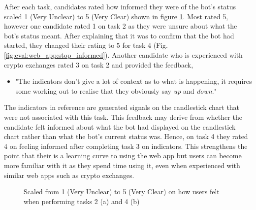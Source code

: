 After each task, candidates rated how informed they were of the bot's status scaled 1 (Very Unclear) to 5 (Very Clear) shown in figure \ref{fig:eval:web_app:start_stop_informed}. Most rated 5, however one candidate rated 1 on task 2 as they were unsure about what the bot's status meant. After explaining that it was to confirm that the bot had started, they changed their rating to 5 for task 4 (Fig. \ref{fig:eval:web_app:stop_informed}). Another candidate who is experienced with crypto exchanges rated 3 on task 2 and provided the feedback,  
\begin{itemize}
\item "The indicators don't give a lot of context as to what is happening, it requires some working out to realise that they obviously say \textit{up} and \textit{down}." 
\end{itemize}
The indicators in reference are generated signals on the candlestick chart that were not associated with this task. This feedback may derive from whether the candidate felt informed about what the bot had displayed on the candlestick chart rather than what the bot's current status was. Hence, on task 4 they rated 4 on feeling informed after completing task 3 on indicators. This strengthens the point that their is a learning curve to using the web app but users can become more familiar with it as they spend time using it, even when experienced with similar web apps such as crypto exchanges.

\begin{figure}[ht]
  \centering
  \hfill
  \caption{Scaled from 1 (Very Unclear) to 5 (Very Clear) on how users felt when performing tasks 2 (a) and 4 (b)}
  \label{fig:eval:web_app:start_stop_informed}
\end{figure}

